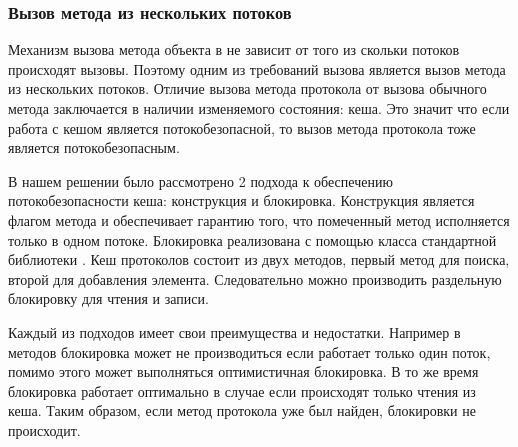 \subsubsection{Вызов метода из нескольких потоков}
Механизм вызова метода объекта в  не зависит от того из скольки потоков происходят вызовы. Поэтому одним из требований вызова является вызов метода из нескольких потоков. Отличие вызова метода протокола от вызова обычного метода заключается в наличии изменяемого состояния: кеша. Это значит что если работа с кешом является потокобезопасной, то вызов метода протокола тоже является потокобезопасным.

В нашем решении было рассмотрено 2 подхода к обеспечению потокобезопасности кеша:  конструкция и  блокировка. Конструкция  является флагом метода и обеспечивает гарантию того, что помеченный метод исполняется только в одном потоке. Блокировка  реализована с помощью класса стандартной библиотеки \cite{jvm:rwlock}. Кеш протоколов состоит из двух методов, первый метод для поиска, второй для добавления элемента. Следовательно можно производить раздельную блокировку для чтения и записи.

Каждый из подходов имеет свои преимущества и недостатки. Например в  методов блокировка может не производиться если работает только один поток, помимо этого может выполняться оптимистичная блокировка\cite{jvm:optimistic_lock}. В то же время  блокировка работает оптимально в случае если происходят только чтения из кеша. Таким образом, если метод протокола уже был найден, блокировки не происходит.
